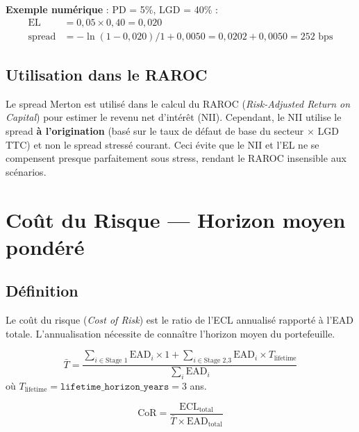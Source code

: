 \documentclass[12pt,a4paper]{article}
\begin{document}
\textbf{Exemple num\'erique} : PD = 5\%, LGD = 40\% :
\begin{align*}
\text{EL} &= 0{,}05 \times 0{,}40 = 0{,}020 \\
\text{spread} &= -\ln(1 - 0{,}020) / 1 + 0{,}0050 = 0{,}0202 + 0{,}0050 = 252\text{ bps}
\end{align*}

\subsection{Utilisation dans le RAROC}

Le spread Merton est utilis\'e dans le calcul du RAROC (\textit{Risk-Adjusted Return on Capital}) pour estimer le revenu net d'int\'er\^et (NII). Cependant, le NII utilise le spread \textbf{\`a l'origination} (bas\'e sur le taux de d\'efaut de base du secteur $\times$ LGD TTC) et non le spread stress\'e courant. Ceci \'evite que le NII et l'EL ne se compensent presque parfaitement sous stress, rendant le RAROC insensible aux sc\'enarios.

\newpage
\section{Co\^ut du Risque --- Horizon moyen pond\'er\'e}
\label{sec:cost_of_risk}

\subsection{D\'efinition}

Le co\^ut du risque (\textit{Cost of Risk}) est le ratio de l'ECL annualis\'e rapport\'e \`a l'EAD totale. L'annualisation n\'ecessite de conna\^itre l'horizon moyen du portefeuille.

\begin{formulebox}
\begin{equation}
\label{eq:t_moyen}
\bar{T} = \frac{\displaystyle\sum_{i \in \text{Stage 1}} \text{EAD}_i \times 1 + \sum_{i \in \text{Stage 2,3}} \text{EAD}_i \times T_{\text{lifetime}}}{\displaystyle\sum_{i} \text{EAD}_i}
\end{equation}
o\`u $T_{\text{lifetime}} = \texttt{lifetime\_horizon\_years} = 3$ ans.
\end{formulebox}

\begin{formulebox}
\begin{equation}
\label{eq:cor}
\text{CoR} = \frac{\text{ECL}_{\text{total}}}{\bar{T} \times \text{EAD}_{\text{total}}}
\end{equation}
\end{formulebox}
\end{document}
